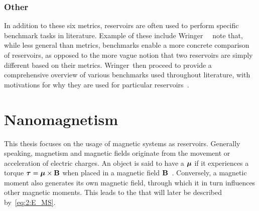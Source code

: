 
\subsubsection{Other} %
In addition to these six metrics, reservoirs are often used to perform specific benchmark tasks in literature.
Example of these include %
Wringer~\etal~\cite{RCbenchmarksReview1} note that, while less general than metrics, benchmarks enable a more concrete comparison of reservoirs, as opposed to the more vague notion that two reservoirs are simply different based on their metrics.
Wringer~\etal then proceed to provide a comprehensive overview of various benchmarks used throughout literature, with motivations for why they are used for particular reservoirs~\cite{RCbenchmarksReview1}.

\newpage
\section{Nanomagnetism}
This thesis focuses on the usage of magnetic systems as reservoirs.
Generally speaking, magnetism and magnetic fields originate from the movement or acceleration of electric charges.
An object is said to have a  $\boldsymbol{\mathbf{\mu}}$ if it experiences a torque $\boldsymbol{\mathbf{\tau}} = \boldsymbol{\mathbf{\mu}} \times \boldsymbol{\mathbf{B}}$ when placed in a magnetic field $\boldsymbol{\mathbf{B}}$~\cite{IntroMagneticMaterials}.
Conversely, a magnetic moment also generates its own magnetic field, through which it in turn influences other magnetic moments.
This leads to the  that will later be described by~\cref{eq:2:E_MS}. %


